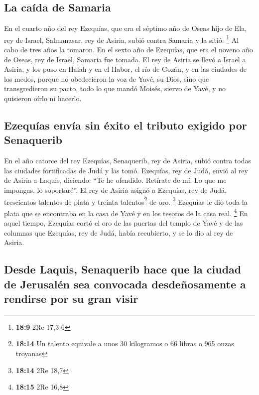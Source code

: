 \begin{paracol}{2}
\hypertarget{la-cauxedda-de-samaria}{%
\subsection{La caída de Samaria}\label{la-cauxedda-de-samaria}}

 En el cuarto año del rey Ezequías, que era el séptimo año
de Oseas hijo de Ela, rey de Israel, Salmanasar, rey de Asiria, subió
contra Samaria y la sitió. \footnote{\textbf{18:9} 2Re 17,3-6}
 Al cabo de tres años la tomaron. En el sexto año de
Ezequías, que era el noveno año de Oseas, rey de Israel, Samaria fue
tomada.  El rey de Asiria se llevó a Israel a Asiria, y
los puso en Halah y en el Habor, el río de Gozán, y en las ciudades de
los medos,  porque no obedecieron la voz de Yavé, su
Dios, sino que transgredieron su pacto, todo lo que mandó Moisés, siervo
de Yavé, y no quisieron oírlo ni hacerlo.

\hypertarget{ezequuxedas-envuxeda-sin-uxe9xito-el-tributo-exigido-por-senaquerib}{%
\subsection{Ezequías envía sin éxito el tributo exigido por
Senaquerib}\label{ezequuxedas-envuxeda-sin-uxe9xito-el-tributo-exigido-por-senaquerib}}

 En el año catorce del rey Ezequías, Senaquerib, rey de
Asiria, subió contra todas las ciudades fortificadas de Judá y las tomó.
 Ezequías, rey de Judá, envió al rey de Asiria a Laquis,
diciendo: ``Te he ofendido. Retírate de mí. Lo que me impongas, lo
soportaré''. El rey de Asiria asignó a Ezequías, rey de Judá,
trescientos talentos de plata y treinta talentos\footnote{\textbf{18:14}
  Un talento equivale a unos 30 kilogramos o 66 libras o 965 onzas
  troyanas} de oro. \footnote{\textbf{18:14} 2Re 18,7} 
Ezequías le dio toda la plata que se encontraba en la casa de Yavé y en
los tesoros de la casa real. \footnote{\textbf{18:15} 2Re 16,8}
 En aquel tiempo, Ezequías cortó el oro de las puertas
del templo de Yavé y de las columnas que Ezequías, rey de Judá, había
recubierto, y se lo dio al rey de Asiria.

\hypertarget{desde-laquis-senaquerib-hace-que-la-ciudad-de-jerusaluxe9n-sea-convocada-desdeuxf1osamente-a-rendirse-por-su-gran-visir}{%
\subsection{Desde Laquis, Senaquerib hace que la ciudad de Jerusalén sea
convocada desdeñosamente a rendirse por su gran
visir}\label{desde-laquis-senaquerib-hace-que-la-ciudad-de-jerusaluxe9n-sea-convocada-desdeuxf1osamente-a-rendirse-por-su-gran-visir}}


\end{paracol}
